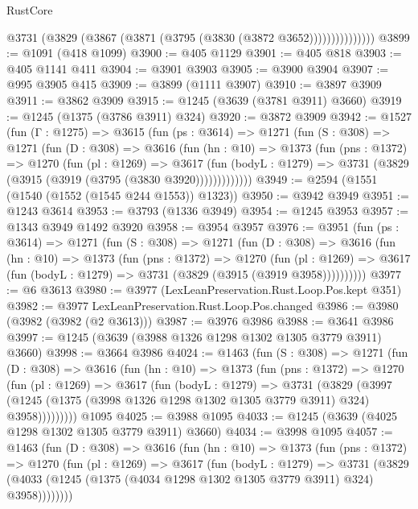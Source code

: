 \begin{lexlean}{RustCore}
\begin{coremodule}
                    @3731 (@3829 (@3867 (@3871 (@3795 (@3830 (@3872 @3652)))))))))))))))
@3899 := @1091 (@418 @1099)
@3900 := @405 @1129
@3901 := @405 @818
@3903 := @405 @1141 @411
@3904 := @3901 @3903
@3905 := @3900 @3904
@3907 := @995 @3905 @415
@3909 := @3899 (@1111 @3907)
@3910 := @3897 @3909
@3911 := @3862 @3909
@3915 := @1245 (@3639 (@3781 @3911) @3660)
@3919 := @1245 (@1375 (@3786 @3911) @324)
@3920 := @3872 @3909
@3942 := @1527
    (fun (Γ : @1275) =>
    @3615
      (fun (ps : @3614) =>
      @1271
        (fun (S : @308) =>
        @1271
          (fun (D : @308) =>
          @3616
            (fun (hn : @10) =>
            @1373
              (fun (pns : @1372) =>
              @1270
                (fun (pl : @1269) =>
                @3617
                  (fun (bodyL : @1279) =>
                  @3731 (@3829 (@3915 (@3919 (@3795 (@3830 @3920)))))))))))))
@3949 := @2594 (@1551 (@1540 (@1552 (@1545 @244 @1553)) @1323))
@3950 := @3942 @3949
@3951 := @1243 @3614
@3953 := @3793 (@1336 @3949)
@3954 := @1245 @3953
@3957 := @1343 @3949 @1492 @3920
@3958 := @3954 @3957
@3976 := @3951
    (fun (ps : @3614) =>
    @1271
      (fun (S : @308) =>
      @1271
        (fun (D : @308) =>
        @3616
          (fun (hn : @10) =>
          @1373
            (fun (pns : @1372) =>
            @1270
              (fun (pl : @1269) =>
              @3617 (fun (bodyL : @1279) => @3731 (@3829 (@3915 (@3919 @3958))))))))))
@3977 := @6 @3613
@3980 := @3977 (LexLeanPreservation.Rust.Loop.Pos.kept @351)
@3982 := @3977 LexLeanPreservation.Rust.Loop.Pos.changed
@3986 := @3980 (@3982 (@3982 (@2 @3613)))
@3987 := @3976 @3986
@3988 := @3641 @3986
@3997 := @1245 (@3639 (@3988 @1326 @1298 @1302 @1305 @3779 @3911) @3660)
@3998 := @3664 @3986
@4024 := @1463
    (fun (S : @308) =>
    @1271
      (fun (D : @308) =>
      @3616
        (fun (hn : @10) =>
        @1373
          (fun (pns : @1372) =>
          @1270
            (fun (pl : @1269) =>
            @3617
              (fun (bodyL : @1279) =>
              @3731
                (@3829
                  (@3997
                    (@1245 (@1375 (@3998 @1326 @1298 @1302 @1305 @3779 @3911) @324) @3958)))))))))
    @1095
@4025 := @3988 @1095
@4033 := @1245 (@3639 (@4025 @1298 @1302 @1305 @3779 @3911) @3660)
@4034 := @3998 @1095
@4057 := @1463
    (fun (D : @308) =>
    @3616
      (fun (hn : @10) =>
      @1373
        (fun (pns : @1372) =>
        @1270
          (fun (pl : @1269) =>
          @3617
            (fun (bodyL : @1279) =>
            @3731
              (@3829 (@4033 (@1245 (@1375 (@4034 @1298 @1302 @1305 @3779 @3911) @324) @3958))))))))

\end{coremodule}
\end{lexlean}
